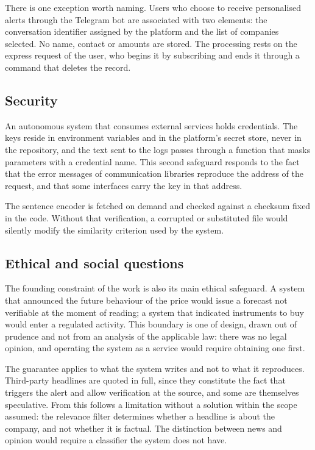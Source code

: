 There is one exception worth naming. Users who choose to receive personalised alerts through the
Telegram bot are associated with two elements: the conversation identifier assigned by the platform
and the list of companies selected. No name, contact or amounts are stored. The processing rests on
the express request of the user, who begins it by subscribing and ends it through a command that
deletes the record.

\subsection{Security}
\label{sec:met_seguranca}

An autonomous system that consumes external services holds credentials. The keys reside in
environment variables and in the platform's secret store, never in the repository, and the text
sent to the logs passes through a function that masks parameters with a credential name. This
second safeguard responds to the fact that the error messages of communication libraries reproduce
the address of the request, and that some interfaces carry the key in that address.

The sentence encoder is fetched on demand and checked against a checksum fixed in the code.
Without that verification, a corrupted or substituted file would silently modify the similarity
criterion used by the system.

\subsection{Ethical and social questions}
\label{sec:met_etica}

The founding constraint of the work is also its main ethical safeguard. A system that announced
the future behaviour of the price would issue a forecast not verifiable at the moment of reading; a
system that indicated instruments to buy would enter a regulated activity. This boundary is one of
design, drawn out of prudence and not from an analysis of the applicable law: there was no legal
opinion, and operating the system as a service would require obtaining one first.

The guarantee applies to what the system writes and not to what it reproduces. Third-party
headlines are quoted in full, since they constitute the fact that triggers the alert and allow
verification at the source, and some are themselves speculative. From this follows a limitation
without a solution within the scope assumed: the relevance filter determines whether a headline is
about the company, and not whether it is factual. The distinction between news and opinion would
require a classifier the system does not have.

